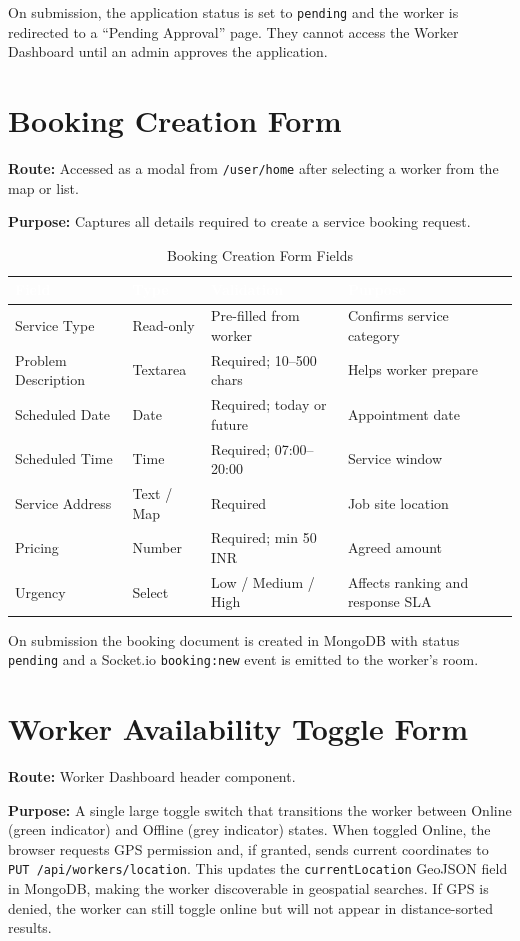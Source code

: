 \documentclass[12pt,a4paper]{report}
\newcommand{\thead}[1]{\cellcolor{tableheader}\textcolor{white}{\textbf{#1}}}
\begin{document}
On submission, the application status is set to \texttt{pending} and the worker is redirected to a ``Pending Approval'' page. They cannot access the Worker Dashboard until an admin approves the application.

\section{Booking Creation Form}

\textbf{Route:} Accessed as a modal from \texttt{/user/home} after selecting a worker from the map or list.

\textbf{Purpose:} Captures all details required to create a service booking request.

\begin{table}[h!]
\centering
\caption{Booking Creation Form Fields}
\renewcommand{\arraystretch}{1.3}
\begin{tabular}{|p{3.5cm}|p{2cm}|p{4cm}|p{3.5cm}|}
\hline
\thead{Field} & \thead{Type} & \thead{Validation} & \thead{Purpose} \\
\hline
Service Type & Read-only & Pre-filled from worker & Confirms service category \\
Problem Description & Textarea & Required; 10--500 chars & Helps worker prepare \\
Scheduled Date & Date & Required; today or future & Appointment date \\
Scheduled Time & Time & Required; 07:00--20:00 & Service window \\
Service Address & Text / Map & Required & Job site location \\
Pricing & Number & Required; min 50 INR & Agreed amount \\
Urgency & Select & Low / Medium / High & Affects ranking and response SLA \\
\hline
\end{tabular}
\end{table}

On submission the booking document is created in MongoDB with status \texttt{pending} and a Socket.io \texttt{booking:new} event is emitted to the worker's room.

\section{Worker Availability Toggle Form}

\textbf{Route:} Worker Dashboard header component.

\textbf{Purpose:} A single large toggle switch that transitions the worker between Online (green indicator) and Offline (grey indicator) states. When toggled Online, the browser requests GPS permission and, if granted, sends current coordinates to \texttt{PUT /api/workers/location}. This updates the \texttt{currentLocation} GeoJSON field in MongoDB, making the worker discoverable in geospatial searches. If GPS is denied, the worker can still toggle online but will not appear in distance-sorted results.
\end{document}
